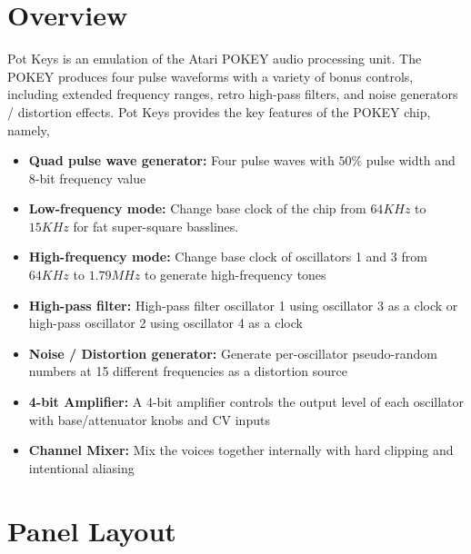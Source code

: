 \documentclass[12pt,letter]{article}
\begin{document}


\section{Overview}

Pot Keys is an emulation of the Atari POKEY audio processing unit. The POKEY produces four pulse waveforms with a variety of bonus controls, including extended frequency ranges, retro high-pass filters, and noise generators / distortion effects. Pot Keys provides the key features of the POKEY chip, namely,
\begin{itemize}
  \item \textbf{Quad pulse wave generator:} Four pulse waves with $50\%$ pulse width and 8-bit frequency value
  \item \textbf{Low-frequency mode:} Change base clock of the chip from $64 KHz$ to $15 KHz$ for fat super-square basslines.
  \item \textbf{High-frequency mode:} Change base clock of oscillators 1 and 3 from $64 KHz$ to $1.79 MHz$ to generate high-frequency tones
  \item \textbf{High-pass filter:} High-pass filter oscillator 1 using oscillator 3 as a clock or high-pass oscillator 2 using oscillator 4 as a clock
  \item \textbf{Noise / Distortion generator:} Generate per-oscillator pseudo-random numbers at 15 different frequencies as a distortion source
  \item \textbf{4-bit Amplifier:} A 4-bit amplifier controls the output level of each oscillator with base/attenuator knobs and CV inputs
  \item \textbf{Channel Mixer:} Mix the voices together internally with hard clipping and intentional aliasing
\end{itemize}


\clearpage
\section{Panel Layout}
\end{document}
